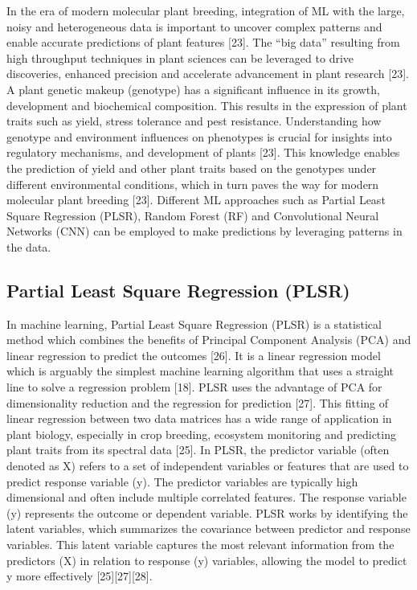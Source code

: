 \documentclass[12pt,a4paper]{report}
\begin{document}
In the era of modern molecular plant breeding, integration of ML with the large, noisy and heterogeneous data is important to uncover complex patterns and enable accurate predictions of plant features [23]. The “big data” resulting from high throughput techniques in plant sciences can be leveraged 
to drive discoveries, enhanced precision and accelerate advancement in plant research [23]. A plant genetic makeup (genotype) has a significant influence in its growth, development and biochemical composition. This results in the expression of plant traits such as yield, stress tolerance and pest resistance. 
Understanding how genotype and environment influences on phenotypes is crucial for insights into regulatory mechanisms, and development of plants [23]. This knowledge enables the  prediction of yield and other plant traits based on the genotypes under different environmental conditions, which in turn paves the 
way for modern molecular plant breeding [23]. Different ML approaches such as Partial Least Square Regression (PLSR), Random Forest (RF) and Convolutional Neural Networks (CNN)  can be employed to make predictions by leveraging patterns in the data. \\

\subsection{Partial Least Square Regression (PLSR)}
In machine learning, Partial Least Square Regression (PLSR) is a statistical method which combines the benefits of Principal Component Analysis (PCA) and linear regression to predict the outcomes [26]. It is a linear regression model which is arguably the simplest machine learning algorithm that uses a straight line to solve a regression problem [18]. PLSR uses the advantage of PCA for dimensionality reduction and the regression for prediction [27].
This fitting of linear regression between two data matrices has a wide range of application in plant biology, especially in crop breeding, ecosystem monitoring and predicting plant traits from its spectral data [25]. In PLSR, the predictor variable (often denoted as X) refers to a set of independent 
variables or features that are used to predict response variable (y). The predictor variables are typically high dimensional and often include multiple correlated features. The response variable (y) represents the outcome or dependent variable. PLSR works by identifying the latent variables, which 
summarizes the covariance between predictor and response variables. This latent variable captures the most relevant information from the predictors (X) in relation to response (y) variables, allowing the model to predict y more effectively [25][27][28]. \\
\end{document}
